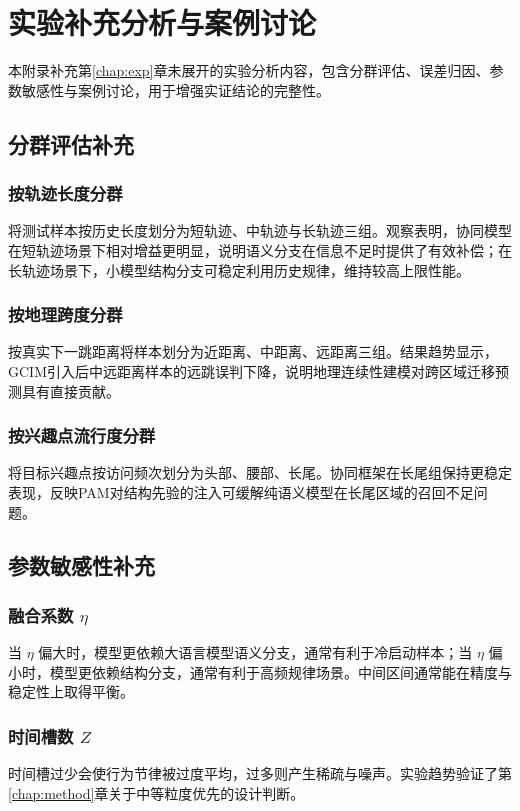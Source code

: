 \chapter{实验补充分析与案例讨论}
\label{appx:exp}

本附录补充第\ref{chap:exp}章未展开的实验分析内容，包含分群评估、误差归因、参数敏感性与案例讨论，用于增强实证结论的完整性。

\section{分群评估补充}
\subsection{按轨迹长度分群}
将测试样本按历史长度划分为短轨迹、中轨迹与长轨迹三组。观察表明，协同模型在短轨迹场景下相对增益更明显，说明语义分支在信息不足时提供了有效补偿；在长轨迹场景下，小模型结构分支可稳定利用历史规律，维持较高上限性能。

\subsection{按地理跨度分群}
按真实下一跳距离将样本划分为近距离、中距离、远距离三组。结果趋势显示，GCIM引入后中远距离样本的远跳误判下降，说明地理连续性建模对跨区域迁移预测具有直接贡献。

\subsection{按兴趣点流行度分群}
将目标兴趣点按访问频次划分为头部、腰部、长尾。协同框架在长尾组保持更稳定表现，反映PAM对结构先验的注入可缓解纯语义模型在长尾区域的召回不足问题。

\section{参数敏感性补充}
\subsection{融合系数 $\eta$}
当 $\eta$ 偏大时，模型更依赖大语言模型语义分支，通常有利于冷启动样本；当 $\eta$ 偏小时，模型更依赖结构分支，通常有利于高频规律场景。中间区间通常能在精度与稳定性上取得平衡。

\subsection{时间槽数 $Z$}
时间槽过少会使行为节律被过度平均，过多则产生稀疏与噪声。实验趋势验证了第\ref{chap:method}章关于中等粒度优先的设计判断。

